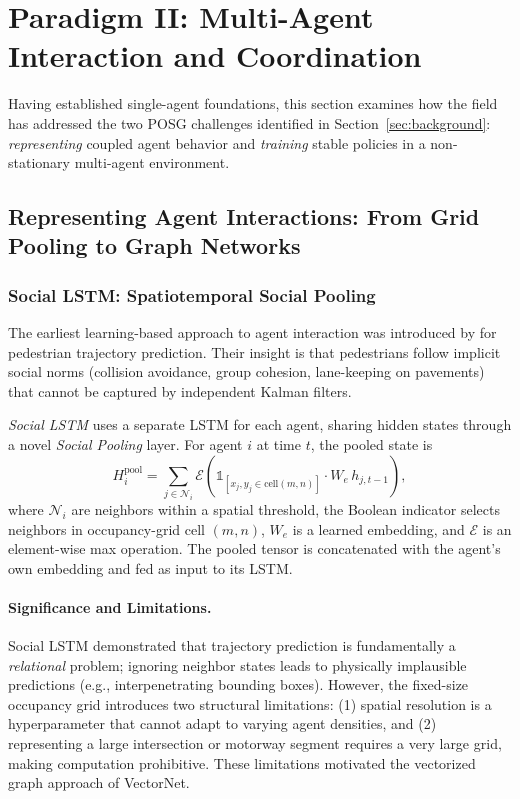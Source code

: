 \documentclass[12pt, a4paper]{article}
\begin{document}
\section{Paradigm II: Multi-Agent Interaction and Coordination}
\label{sec:interaction}

Having established single-agent foundations, this section examines how the field
has addressed the two POSG challenges identified in Section~\ref{sec:background}:
\emph{representing} coupled agent behavior and \emph{training} stable policies in
a non-stationary multi-agent environment.

\subsection{Representing Agent Interactions: From Grid Pooling to Graph Networks}

\subsubsection{Social LSTM: Spatiotemporal Social Pooling}
\label{sec:social}

The earliest learning-based approach to agent interaction was introduced by
\citet{alahi2016social} for pedestrian trajectory prediction. Their insight is that
pedestrians follow implicit social norms (collision avoidance, group cohesion,
lane-keeping on pavements) that cannot be captured by independent Kalman filters.

\emph{Social LSTM} uses a separate LSTM for each agent, sharing hidden states
through a novel \emph{Social Pooling} layer. For agent $i$ at time $t$, the pooled
state is
\begin{equation}
  H_i^{\text{pool}} =
    \sum_{j \in \mathcal{N}_i}
    \mathcal{E}\!\left( \mathbb{1}_{[x_j, y_j \in \text{cell}(m,n)]} \cdot
                  W_e\, h_{j,t-1} \right),
\end{equation}
where $\mathcal{N}_i$ are neighbors within a spatial threshold, the Boolean
indicator selects neighbors in occupancy-grid cell $(m,n)$, $W_e$ is a learned
embedding, and $\mathcal{E}$ is an element-wise max operation. The pooled tensor
is concatenated with the agent's own embedding and fed as input to its LSTM.

\paragraph{Significance and Limitations.}
Social LSTM demonstrated that trajectory prediction is fundamentally a
\emph{relational} problem; ignoring neighbor states leads to physically
implausible predictions (e.g., interpenetrating bounding boxes). However, the
fixed-size occupancy grid introduces two structural limitations: (1) spatial
resolution is a hyperparameter that cannot adapt to varying agent densities, and
(2) representing a large intersection or motorway segment requires a very large
grid, making computation prohibitive. These limitations motivated the vectorized
graph approach of VectorNet.
\end{document}
